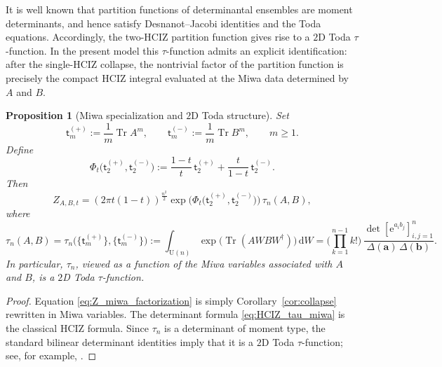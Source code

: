 \documentclass[11pt,a4paper]{article}
\newtheorem{proposition}[theorem]{Proposition}
\theoremstyle{definition}\newtheorem{definition}[theorem]{Definition}
\theoremstyle{remark}\newtheorem{remark}[theorem]{Remark}
\numberwithin{equation}{section}
\DeclareMathOperator{\Tr}{Tr}
\newcommand{\e}{\mathrm{e}}
\newcommand{\dd}{\mathrm{d}}
\newcommand{\UU}{\mathrm{U}(n)}
\begin{document}
It is well known that partition functions of determinantal ensembles are moment determinants, and hence satisfy Desnanot--Jacobi identities and the Toda equations. Accordingly, the two-HCIZ partition function gives rise to a $2$D Toda $\tau$-function. In the present model this $\tau$-function admits an explicit identification: after the single-HCIZ collapse, the nontrivial factor of the partition function is precisely the compact HCIZ integral evaluated at the Miwa data determined by $A$ and $B$.

\begin{proposition}[Miwa specialization and $2$D Toda structure]
Set
\begin{equation} 
\mathsf t_m^{(+)}:=\frac1m\Tr A^m,
\qquad
\mathsf t_m^{(-)}:=\frac1m\Tr B^m,
\qquad m\ge1.
\end{equation}
Define
\begin{equation} 
\Phi_t\big(\mathsf t_2^{(+)},\mathsf t_2^{(-)}\big)
:=
\frac{1-t}{t}\,\mathsf t_2^{(+)}
+
\frac{t}{1-t}\,\mathsf t_2^{(-)}.
\end{equation}
Then
\begin{equation}\label{eq:Z_miwa_factorization}
Z_{A,B,t}
=
(2\pi t(1-t))^{\frac{n^2}{2}}
\exp\!\Big(\Phi_t\big(\mathsf t_2^{(+)},\mathsf t_2^{(-)}\big)\Big)\,
\tau_n(A,B),
\end{equation}
where
\begin{equation}\label{eq:HCIZ_tau_miwa}
\tau_n(A,B)=\tau_n\!\big(\{\mathsf t_m^{(+)}\},\{\mathsf t_m^{(-)}\}\big):=\int_{\UU}\exp\!\big(\Tr(AWBW^\dagger)\big)\,\dd W=\Big(\prod_{k=1}^{n-1}k!\Big)\,
\frac{\det[\e^{a_i b_j}]_{i,j=1}^n}{\Delta(\bm a)\,\Delta(\bm b)}.
\end{equation}
In particular, $\tau_n$, viewed as a function of the Miwa variables associated with $A$ and $B$, is a $2$D Toda $\tau$-function.
\end{proposition}

\begin{proof}
Equation \eqref{eq:Z_miwa_factorization} is simply Corollary~\ref{cor:collapse} rewritten in Miwa variables.
The determinant formula \eqref{eq:HCIZ_tau_miwa} is the classical HCIZ formula.
Since $\tau_n$ is a determinant of moment type, the standard bilinear determinant identities imply that it is a $2$D Toda $\tau$-function;  see, for example,
\cite{ZinnJustin2002,HarnadOrlov2003,Orlov2002}.
\end{proof}

 
 
\end{document}
